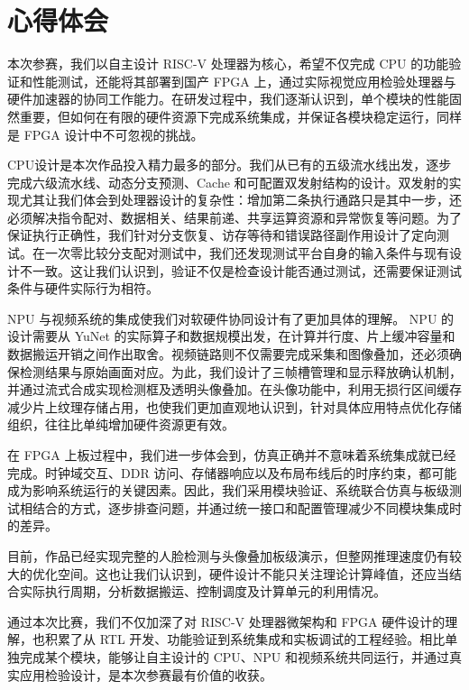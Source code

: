 \section{心得体会}

本次参赛，我们以自主设计 RISC-V 处理器为核心，希望不仅完成 CPU 的功能验证和性能测试，还能将其部署到国产 FPGA 上，通过实际视觉应用检验处理器与硬件加速器的协同工作能力。在研发过程中，我们逐渐认识到，单个模块的性能固然重要，但如何在有限的硬件资源下完成系统集成，并保证各模块稳定运行，同样是 FPGA 设计中不可忽视的挑战。

CPU设计是本次作品投入精力最多的部分。我们从已有的五级流水线出发，逐步完成六级流水线、动态分支预测、Cache 和可配置双发射结构的设计。双发射的实现尤其让我们体会到处理器设计的复杂性：增加第二条执行通路只是其中一步，还必须解决指令配对、数据相关、结果前递、共享运算资源和异常恢复等问题。为了保证执行正确性，我们针对分支恢复、访存等待和错误路径副作用设计了定向测试。在一次零比较分支配对测试中，我们还发现测试平台自身的输入条件与现有设计不一致。这让我们认识到，验证不仅是检查设计能否通过测试，还需要保证测试条件与硬件实际行为相符。

NPU 与视频系统的集成使我们对软硬件协同设计有了更加具体的理解。 NPU 的设计需要从 YuNet 的实际算子和数据规模出发，在计算并行度、片上缓冲容量和数据搬运开销之间作出取舍。视频链路则不仅需要完成采集和图像叠加，还必须确保检测结果与原始画面对应。为此，我们设计了三帧槽管理和显示释放确认机制，并通过流式合成实现检测框及透明头像叠加。在头像功能中，利用无损行区间缓存减少片上纹理存储占用，也使我们更加直观地认识到，针对具体应用特点优化存储组织，往往比单纯增加硬件资源更有效。

在 FPGA 上板过程中，我们进一步体会到，仿真正确并不意味着系统集成就已经完成。时钟域交互、DDR 访问、存储器响应以及布局布线后的时序约束，都可能成为影响系统运行的关键因素。因此，我们采用模块验证、系统联合仿真与板级测试相结合的方式，逐步排查问题，并通过统一接口和配置管理减少不同模块集成时的差异。

目前，作品已经实现完整的人脸检测与头像叠加板级演示，但整网推理速度仍有较大的优化空间。这也让我们认识到，硬件设计不能只关注理论计算峰值，还应当结合实际执行周期，分析数据搬运、控制调度及计算单元的利用情况。

通过本次比赛，我们不仅加深了对 RISC-V 处理器微架构和 FPGA 硬件设计的理解，也积累了从 RTL 开发、功能验证到系统集成和实板调试的工程经验。相比单独完成某个模块，能够让自主设计的 CPU、NPU 和视频系统共同运行，并通过真实应用检验设计，是本次参赛最有价值的收获。
